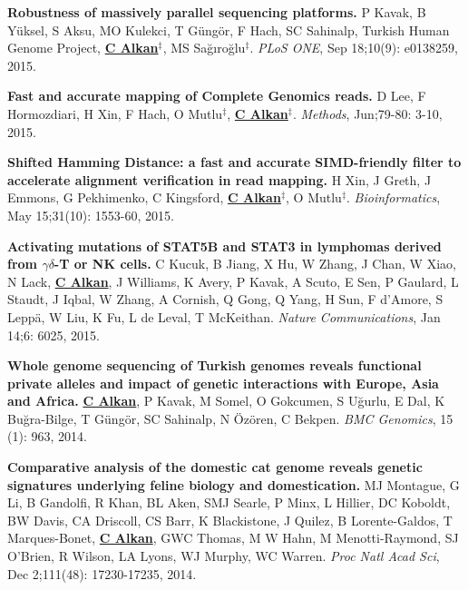   \vspace{-.2cm}        
  {\bf Robustness of massively parallel sequencing platforms.}
  P Kavak, B Yüksel, S Aksu, MO Kulekci, T Güngör, F Hach, SC Sahinalp, Turkish Human Genome Project, {\bf {\underline {C Alkan}}}$^\ddag$,
  MS Sağıroğlu$^\ddag$.    
  {\em PLoS ONE},  Sep 18;10(9): e0138259, 2015.  


  \vspace{-.2cm}        
  {\bf Fast and accurate mapping of Complete Genomics reads.}
  D Lee, F Hormozdiari, H Xin, F Hach, O Mutlu$^\ddag$,  {\bf {\underline {C Alkan}}}$^\ddag$.
  {\em Methods}, Jun;79-80: 3-10, 2015. 

  \vspace{-.2cm}        
  {\bf Shifted Hamming Distance: a fast and accurate SIMD-friendly filter to accelerate alignment verification in read mapping.} H Xin, J Greth, J Emmons, 
G Pekhimenko, C Kingsford, {\bf {\underline{C Alkan}}}$^\ddag$,  O Mutlu$^\ddag$. {\em Bioinformatics},  May 15;31(10): 1553-60, 2015.



  \vspace{-.2cm}        
  {\bf Activating mutations of STAT5B and STAT3 in lymphomas derived from $\gamma\delta$-T or NK cells.}
   C Kucuk, B Jiang, X Hu, W Zhang, J Chan, W Xiao, N Lack,   {\bf {\underline {C Alkan}}},  J Williams, K Avery, P Kavak, A Scuto, E Sen,  P Gaulard, L Staudt, J Iqbal,  W Zhang,  A Cornish, Q Gong, Q  Yang, H Sun, F d'Amore, S Leppä, W Liu, K Fu, L de Leval, T McKeithan.
 {\em Nature Communications}, Jan 14;6: 6025, 2015.


  \vspace{-.2cm}        
  {\bf Whole genome sequencing of Turkish genomes reveals functional private alleles and impact of genetic interactions with Europe, Asia and Africa.}
  {\bf {\underline {C Alkan}}}, P Kavak, M Somel, O Gokcumen, S Uğurlu, E Dal, K Buğra-Bilge,  T Güngör, SC Sahinalp, N Özören, C Bekpen.
  {\em BMC Genomics}, 15 (1): 963, 2014.


  \vspace{-.2cm}        
  {\bf Comparative analysis of the domestic cat genome reveals genetic signatures underlying feline biology and domestication.}
  MJ Montague, G Li, B Gandolfi, R Khan, BL Aken, SMJ Searle, P Minx, L Hillier, DC Koboldt, BW Davis, CA Driscoll, 
  CS Barr, K Blackistone, J Quilez, B Lorente-Galdos, T Marques-Bonet, {\bf {\underline {C Alkan}}}, GWC Thomas, M W Hahn, M Menotti-Raymond, 
  SJ O’Brien, R Wilson, LA Lyons, WJ Murphy, WC Warren. {\em Proc Natl Acad Sci}, Dec 2;111(48): 17230-17235, 2014.

